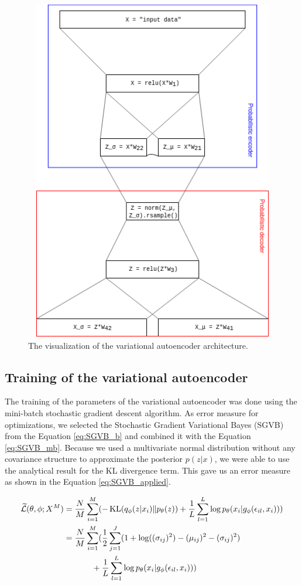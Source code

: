 \begin{figure}[H]
    \centering
    \includegraphics[width=12cm, height=15cm]{images/VAE_final.png}
    \caption{The visualization of the variational autoencoder architecture.}
    \label{fig:VAE}
\end{figure}

\subsection{Training of the variational autoencoder}
The training of the parameters of the variational autoencoder was done using the mini-batch stochastic gradient descent algorithm.
As error measure for optimizations, we selected the Stochastic Gradient Variational Bayes (SGVB) from the Equation \ref{eq:SGVB_b} and combined it with the Equation \ref{eq:SGVB_mb}.
Because we used a multivariate normal distribution without any covariance structure to approximate the posterior $p(z|x)$, we were able to use the analytical result for the KL divergence term.
This gave us an error measure as shown in the Equation \ref{eq:SGVB_applied}.

\begin{equation}
\begin{split}
    \widetilde{\mathcal{L}}(\theta, \phi; X^M) &= \frac{N}{M} \sum_{i=1}^{M} (-\operatorname{KL}(q_{\phi}(z|x_i) \| p_{\theta}(z)) + \frac{1}{L}\sum_{l=1}^{L} \log p_{\theta}(x_i|g_{\phi}(\epsilon_{il}, x_i))) \\
    &= \frac{N}{M} \sum_{i=1}^{M} (
     \frac{1}{2}\sum_{j=1}^{J}(1 + \log((\sigma_{ij})^2) - (\mu_{ij})^2 - (\sigma_{ij})^2) \\
    &\hspace{1.2cm}+\frac{1}{L}\sum_{l=1}^{L} \log p_{\theta}(x_i|g_{\phi}(\epsilon_{il}, x_i)))
\end{split}
\label{eq:SGVB_applied}
\end{equation}

